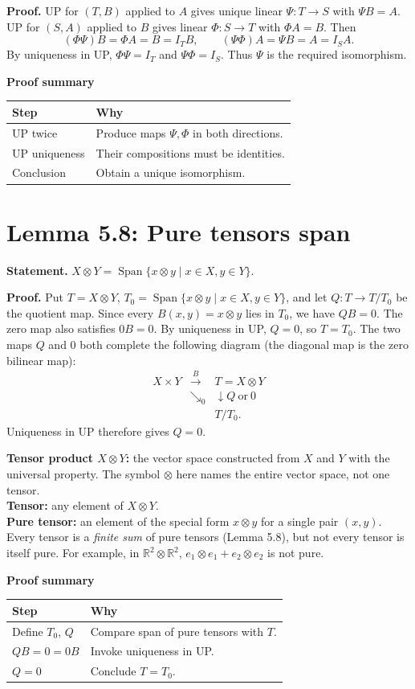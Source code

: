 \documentclass[11pt,a4paper]{article}
\newcommand{\prooftable}[1]{\medskip\textbf{Proof summary}\par\smallskip #1\medskip}
\begin{document}
\textbf{Proof.} UP for \((T,B)\) applied to \(A\) gives unique linear \(\Psi:T\to S\) with \(\Psi B=A\). UP for \((S,A)\) applied to \(B\) gives linear \(\Phi:S\to T\) with \(\Phi A=B\). Then
\[
(\Phi\Psi)B=\Phi A=B=I_TB,\qquad
(\Psi\Phi)A=\Psi B=A=I_SA.
\]
By uniqueness in UP, \(\Phi\Psi=I_T\) and \(\Psi\Phi=I_S\). Thus \(\Psi\) is the required isomorphism.

\prooftable{\begin{tabularx}{\linewidth}{@{}p{.28\linewidth}X@{}}\hline
Step & Why\\\hline
UP twice & Produce maps \(\Psi,\Phi\) in both directions.\\
UP uniqueness & Their compositions must be identities.\\
Conclusion & Obtain a unique isomorphism.\\\hline
\end{tabularx}}

\section*{Lemma 5.8: Pure tensors span}
\textbf{Statement.} \(X\otimes Y=\operatorname{Span}\{x\otimes y\mid x\in X,y\in Y \}\).

\textbf{Proof.} Put \(T=X\otimes Y\), \(T_0=\operatorname{Span}\{x\otimes y\mid x\in X,y\in Y\}\), and let \(Q:T\to T/T_0\) be the quotient map. Since every \(B(x,y)=x\otimes y\) lies in \(T_0\), we have \(QB=0\). The zero map also satisfies \(0B=0\). By uniqueness in UP, \(Q=0\), so \(T=T_0\).
The two maps \(Q\) and \(0\) both complete the following diagram (the diagonal map is the zero bilinear map):
\[
\begin{array}{ccc}
X\times Y&\xrightarrow{\ B\ }&T=X\otimes Y\\
&\searrow_{\scriptstyle 0}&\downarrow\scriptstyle{Q\ \text{or}\ 0}\\
&&T/T_0.
\end{array}
\]
Uniqueness in UP therefore gives \(Q=0\).
\begin{personalnote}[title=Definitions for understanding]
\textbf{Tensor product \(X\otimes Y\):} the vector space constructed from \(X\) and \(Y\) with the universal property. The symbol \(\otimes\) here names the entire vector space, not one tensor.\\
\textbf{Tensor:} any element of \(X\otimes Y\).\\
\textbf{Pure tensor:} an element of the special form \(x\otimes y\) for a single pair \((x,y)\). Every tensor is a \emph{finite sum} of pure tensors (Lemma 5.8), but not every tensor is itself pure. For example, in \(\mathbb R^2\otimes\mathbb R^2\), \(e_1\otimes e_1+e_2\otimes e_2\) is not pure.
\end{personalnote}
\prooftable{\begin{tabularx}{\linewidth}{@{}p{.28\linewidth}X@{}}\hline
Step & Why\\\hline
Define \(T_0\), \(Q\) & Compare span of pure tensors with \(T\).\\
\(QB=0=0B\) & Invoke uniqueness in UP.\\
\(Q=0\) & Conclude \(T=T_0\).\\\hline
\end{tabularx}}
\end{document}
